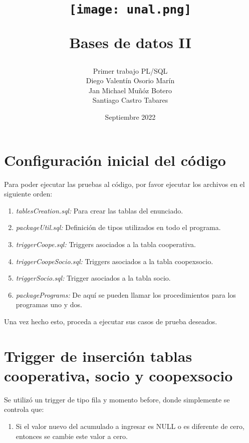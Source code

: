 \documentclass{article}
\title{
\begin{center}
    \texttt{[image: unal.png]}
\end{center}
\vspace{2cm}
Bases de datos II \\
}
\author{
\vspace{5cm}
Primer trabajo PL/SQL \\
Diego Valentín Osorio Marín \\
Jan Michael Muñóz Botero \\
Santiago Castro Tabares 
\vspace{7cm}}
\date{Septiembre 2022}
\begin{document}
\maketitle

\section{Configuración inicial del código}
Para poder ejecutar las pruebas al código, por favor ejecutar los archivos en el siguiente orden:
\begin{enumerate}
    \begin{enumerate}
        \item \emph{tablesCreation.sql:} Para crear las tablas del enunciado.
        \item \emph{packageUtil.sql:} Definición de tipos utilizados en todo el programa.
        \item \emph{triggerCoope.sql:} Triggers asociados a la tabla cooperativa.
        \item \emph{triggerCoopeSocio.sql:} Triggers asociados a la tabla coopexsocio.
        \item \emph{triggerSocio.sql:} Trigger asociados a la tabla socio.
        \item \emph{packagePrograms:} De aquí se pueden llamar los procedimientos para los programas uno y dos.
    \end{enumerate}
\end{enumerate}
Una vez hecho esto, proceda a ejecutar sus casos de prueba deseados.
\section{Trigger de inserción tablas cooperativa, socio y coopexsocio}
Se utilizó un trigger de tipo fila y momento before, donde simplemente se controla que:
\begin{enumerate}
        \item Si el valor nuevo del acumulado a ingresar es NULL o es diferente de cero, entonces se cambie este valor a cero.
\end{enumerate}
\end{document}

